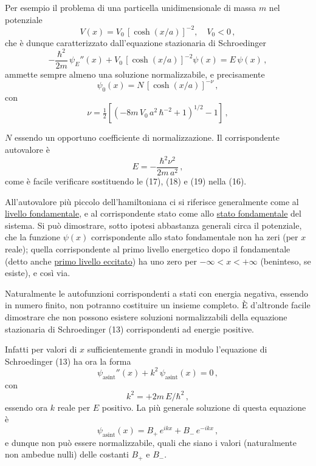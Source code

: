 \documentclass[11pt, a4paper]{book}
\numberwithin{equation}{section}
\begin{document}
Per esempio il problema di una particella unidimensionale di massa
$m$ nel potenziale
\begin{equation}
V(x) = V_0\, \left[\cosh(x/a)\right]^{-2}, \quad V_0 < 0 \,, \tag{15}
\end{equation}
che è dunque caratterizzato dall'equazione stazionaria di Schroedinger
\begin{equation}
-\frac{\hbar^2}{2m}\, \psi_E''(x) + V_0\, \left[\cosh(x/a)\right]^{-2} \psi(x) = E\, \psi(x) \,, \tag{16}
\end{equation}
ammette sempre almeno una soluzione normalizzabile, e precisamente
\begin{equation}
\psi_0(x) = N\, \left[\cosh(x/a)\right]^{-\nu} \,, \tag{17}
\end{equation}
con
\begin{equation}
\nu = \tfrac{1}{2}\left[\left(-8m\, V_0\, a^2\, \hbar^{-2} + 1\right)^{1/2} - 1\right] \,, \tag{18}
\end{equation}


$N$ essendo un opportuno coefficiente di normalizzazione. Il corrispondente autovalore è
\begin{equation}
E = -\frac{\hbar^2 \nu^2}{2m\, a^2} \,, \tag{19}
\end{equation}
come è facile verificare sostituendo le (17), (18) e (19) nella (16).

All'autovalore più piccolo dell'hamiltoniana ci si riferisce generalmente come al \uline{livello fondamentale}, e al corrispondente stato come allo \uline{stato fondamentale} del sistema. Si può dimostrare, sotto ipotesi abbastanza generali circa il potenziale, che la funzione $\psi(x)$ corrispondente allo stato fondamentale non ha zeri (per $x$ reale); quella corrispondente al primo livello energetico dopo il fondamentale (detto anche \uline{primo livello eccitato}) ha uno zero per $-\infty < x < +\infty$ (beninteso, se esiste), e così via.

Naturalmente le autofunzioni corrispondenti a stati con energia negativa, essendo in numero finito, non potranno costituire un insieme completo. È d'altronde facile dimostrare che non possono esistere soluzioni normalizzabili della equazione stazionaria di Schroedinger (13) corrispondenti ad energie positive.

Infatti per valori di $x$ sufficientemente grandi in modulo l'equazione di Schroedinger (13) ha ora la forma
\[
\psi_{\text{asint}}''(x) + k^2\, \psi_{\text{asint}}(x) = 0 \,,
\]
con
\[
k^2 = +2m\, E / \hbar^2 \,,
\]
essendo ora $k$ reale per $E$ positivo. La più generale soluzione di questa equazione è
\[
\psi_{\text{asint}}(x) = B_+\, e^{ikx} + B_-\, e^{-ikx} \,,
\]
e dunque non può essere normalizzabile, quali che siano i valori (naturalmente non ambedue nulli) delle costanti $B_+$ e $B_-$.
\end{document}
